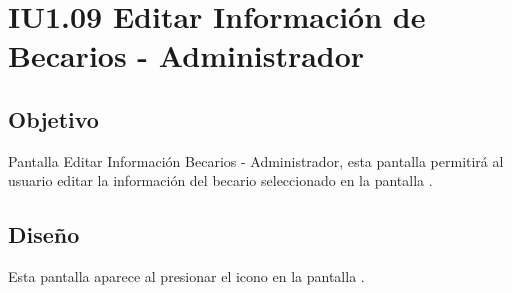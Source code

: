 \newpage
\section{IU1.09 Editar Información de Becarios - Administrador}

\subsection{Objetivo}
	Pantalla Editar Información Becarios - Administrador, esta pantalla permitirá al usuario  editar la información del becario seleccionado en la pantalla .
	
	


\subsection{Diseño}
    Esta pantalla aparece al presionar el icono \faEdit en la pantalla .

	
